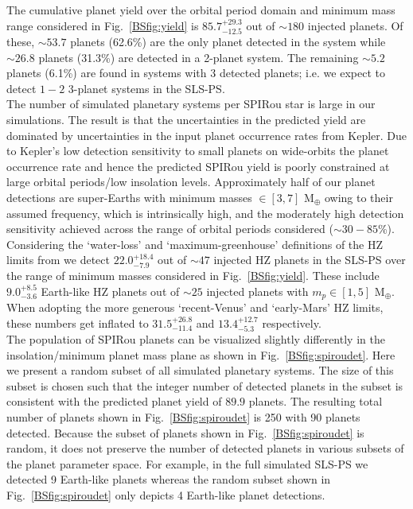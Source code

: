 The cumulative planet yield over the orbital period domain and minimum mass range considered in
Fig.~\ref{BSfig:yield} is $85.7^{+29.3}_{-12.5}$ out of $\sim 180$ injected planets.
Of these, $\sim 53.7$ planets (62.6\%) are
the only planet detected in the system while $\sim 26.8$ planets (31.3\%) are detected in a
2-planet system. The remaining
$\sim 5.2$ planets (6.1\%) are found in systems with 3 detected planets; i.e. we expect to detect
$1-2$ 3-planet systems in the SLS-PS. \\

The number of simulated planetary systems per SPIRou star is large in our simulations. The
result is that the uncertainties in the
predicted yield are dominated by uncertainties in the input planet occurrence
rates from Kepler. Due to Kepler's low detection sensitivity to small planets on
wide-orbits the planet occurrence rate and hence the predicted SPIRou yield is
poorly constrained at large orbital periods/low insolation levels.
Approximately half of our planet detections are super-Earths
with minimum masses \msini{} $\in [3,7]$ M$_{\oplus}$ owing to their assumed frequency,
which is intrinsically
high, and the moderately high detection sensitivity achieved across the
range of orbital periods considered ($\sim 30-85$\%). Considering the `water-loss' and
`maximum-greenhouse' definitions of the HZ limits from
\citep{kopparapu13} we detect $22.0^{+18.4}_{-7.9}$ out of $\sim 47$ injected
HZ planets in the SLS-PS over the range of minimum masses considered in Fig.~\ref{BSfig:yield}. These include
$9.0^{+8.5}_{-3.6}$ Earth-like HZ planets out of $\sim 25$ injected planets with $m_p \in [1,5]$ M$_{\oplus}$.
When adopting the more generous `recent-Venus' and `early-Mars' HZ limits, these numbers get inflated to
$31.5^{+26.8}_{-11.4}$ and $13.4^{+12.7}_{-5.3}$ respectively.  \\

The population of SPIRou planets can be visualized slightly differently in the
insolation/minimum planet mass plane as shown in Fig.~\ref{BSfig:spiroudet}. Here we
present a random subset of all simulated planetary systems. The size of this subset is
chosen such that the integer number of detected planets in the subset is consistent with
the predicted planet yield of $89.9$ planets. The resulting total number
of planets shown in Fig.~\ref{BSfig:spiroudet} is 250 with 90 planets detected. Because the
subset of planets shown in Fig.~\ref{BSfig:spiroudet} is random, it does not preserve the
number of detected planets in various subsets of the planet parameter space. For example,
in the full simulated SLS-PS we detected 9 Earth-like planets whereas the random subset
shown in Fig.~\ref{BSfig:spiroudet} only depicts 4 Earth-like planet detections. \\


